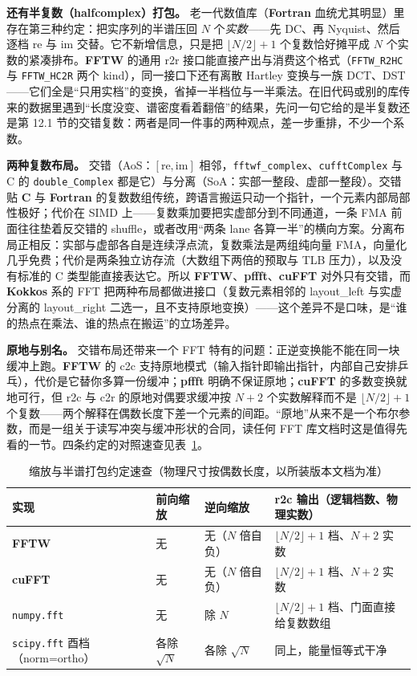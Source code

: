 \documentclass[12pt,a4paper,fontset=fandol]{ctexbook}
\newcommand{\Tp}[1]{\texttt{#1}}
\newcommand{\Lib}[1]{\textbf{#1}}
\newcommand{\Lang}[1]{\textsf{\bfseries #1}}
\newcommand{\CL}{\Lang{C}}
\newcommand{\FTN}{\Lang{Fortran}}
\begin{document}
\textbf{还有半复数（halfcomplex）打包。} 老一代数值库（\FTN{} 血统尤其明显）里存在第三种约定：把实序列的半谱压回 $N$ 个\emph{实数}——先 DC、再 Nyquist、然后逐档 re 与 im 交替。它不新增信息，只是把 $\lfloor N/2 \rfloor + 1$ 个复数恰好摊平成 $N$ 个实数的紧凑排布。\Lib{FFTW} 的通用 r2r 接口能直接产出与消费这个格式（\Tp{FFTW\_R2HC} 与 \Tp{FFTW\_HC2R} 两个 kind），同一接口下还有离散 Hartley 变换与一族 DCT、DST——它们全是``只用实档''的变换，省掉一半档位与一半乘法。在旧代码或别的库传来的数据里遇到``长度没变、谱密度看着翻倍''的结果，先问一句它给的是半复数还是第 12.1 节的交错复数：两者是同一件事的两种观点，差一步重排，不少一个系数。

\textbf{两种复数布局。} 交错（AoS：$[\mathrm{re},\mathrm{im}]$ 相邻，\Tp{fftwf\_complex}、\Tp{cufftComplex} 与 C 的 \Tp{double\_Complex} 都是它）与分离（SoA：实部一整段、虚部一整段）。交错贴 \CL{} 与 \FTN{} 的复数数组传统，跨语言搬运只动一个指针，一个元素内部局部性极好；代价在 SIMD 上——复数乘加要把实虚部分到不同通道，一条 FMA 前面往往垫着反交错的 shuffle，或者改用``两条 lane 各算一半''的横向方案。分离布局正相反：实部与虚部各自是连续浮点流，复数乘法是两组纯向量 FMA，向量化几乎免费；代价是两条独立访存流（大数组下两倍的预取与 TLB 压力），以及没有标准的 C 类型能直接表达它。所以 \Lib{FFTW}、\Lib{pffft}、\Lib{cuFFT} 对外只有交错，而 \Lib{Kokkos} 系的 FFT 把两种布局都做进接口（复数元素相邻的 layout\_left 与实虚分离的 layout\_right 二选一，且不支持原地变换）——这个差异不是口味，是``谁的热点在乘法、谁的热点在搬运''的立场差异。

\textbf{原地与别名。} 交错布局还带来一个 FFT 特有的问题：正逆变换能不能在同一块缓冲上跑。\Lib{FFTW} 的 c2c 支持原地模式（输入指针即输出指针，内部自己安排乒乓），代价是它替你多算一份缓冲；\Lib{pffft} 明确不保证原地；\Lib{cuFFT} 的多数变换就地可行，但 r2c 与 c2r 的原地对偶要求缓冲按 $N+2$ 个实数解释而不是 $\lfloor N/2\rfloor+1$ 个复数——两个解释在偶数长度下差一个元素的间距。``原地''从来不是一个布尔参数，而是一组关于读写冲突与缓冲形状的合同，读任何 FFT 库文档时这是值得先看的一节。四条约定的对照速查见表~\ref{tab:ch12-conventions}。

\begin{table}[H]
\centering
\caption{缩放与半谱打包约定速查（物理尺寸按偶数长度，以所装版本文档为准）}
\label{tab:ch12-conventions}
\small
\begin{tabular}{@{}>{\raggedright\arraybackslash}p{}
  >{\raggedright\arraybackslash}p{}
  >{\raggedright\arraybackslash}p{}
  >{\raggedright\arraybackslash}p{}@{}}
\toprule
实现 & 前向缩放 & 逆向缩放 & r2c 输出（逻辑档数、物理实数） \\
\midrule
\Lib{FFTW} & 无 & 无（$N$ 倍自负） &
  $\lfloor N/2 \rfloor + 1$ 档、$N+2$ 实数 \\
\Lib{cuFFT} & 无 & 无（$N$ 倍自负） &
  $\lfloor N/2 \rfloor + 1$ 档、$N+2$ 实数 \\
\Tp{numpy.fft} & 无 & 除 $N$ &
  $\lfloor N/2 \rfloor + 1$ 档、门面直接给复数数组 \\
\Tp{scipy.fft} 酉档（norm=ortho） & 各除 $\sqrt{N}$ & 各除 $\sqrt{N}$ &
  同上，能量恒等式干净 \\
\bottomrule
\end{tabular}
\end{table}
\end{document}
